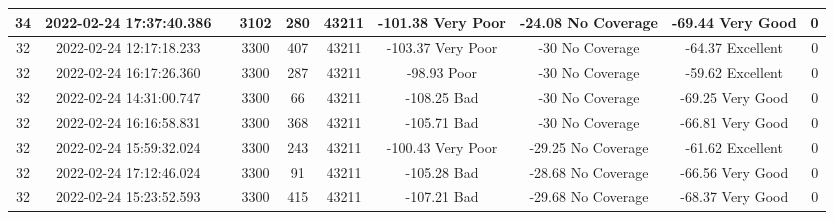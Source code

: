 \begin{longtable*}{|c|c|c|c|c|c|c|c|c|c|}
34&2022-02-24 17:37:40.386&&3102&280&43211& -101.38   Very Poor   & -24.08    No Coverage & -69.44    Very Good   & 0\\\hline
{}32&2022-02-24 12:17:18.233&&3300&407&43211& -103.37   Very Poor   & -30       No Coverage & -64.37    Excellent   & 0\\\hline
{}32&2022-02-24 16:17:26.360&&3300&287&43211& -98.93    Poor        & -30       No Coverage & -59.62    Excellent   & 0\\\hline
{}32&2022-02-24 14:31:00.747&&3300&66&43211& -108.25   Bad         & -30       No Coverage & -69.25    Very Good   & 0\\\hline
{}32&2022-02-24 16:16:58.831&&3300&368&43211& -105.71   Bad         & -30       No Coverage & -66.81    Very Good   & 0\\\hline
{}32&2022-02-24 15:59:32.024&&3300&243&43211& -100.43   Very Poor   & -29.25    No Coverage & -61.62    Excellent   & 0\\\hline
{}32&2022-02-24 17:12:46.024&&3300&91&43211& -105.28   Bad         & -28.68    No Coverage & -66.56    Very Good   & 0\\\hline
{}32&2022-02-24 15:23:52.593&&3300&415&43211& -107.21   Bad         & -29.68    No Coverage & -68.37    Very Good   & 0\\\hline

\end{longtable*}
